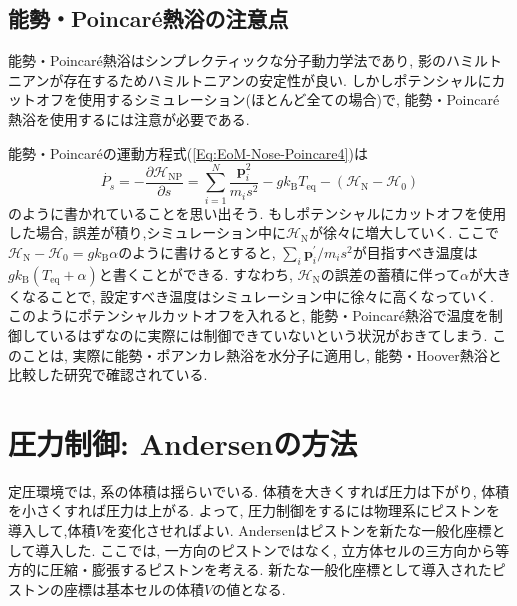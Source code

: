 \subsection{能勢・Poincar\'{e}熱浴の注意点}
能勢・Poincar\'{e}熱浴はシンプレクティックな分子動力学法であり, 影のハミルトニアンが存在するためハミルトニアンの安定性が良い. しかしポテンシャルにカットオフを使用するシミュレーション(ほとんど全ての場合)で, 能勢・Poincar\'{e}熱浴を使用するには注意が必要である. 

能勢・Poincar\'{e}の運動方程式(\ref{Eq:EoM-Nose-Poincare4})は
\begin{equation}
  \dot{P_{s}}
  =-
  \frac{\partial \mathcal{H}_{\mathrm{NP}}}{\partial s}
  =
  \sum_{i=1}^{N}
  \frac{\bm{p}_{i}^{2}}{m_{i}s^{2}}
  - g k_{\mathrm{B}} T_{\mathrm{eq}}
  - (\mathcal{H}_{\mathrm{N}} - \mathcal{H}_{0})
\end{equation}
のように書かれていることを思い出そう. もしポテンシャルにカットオフを使用した場合, 誤差が積り,シミュレーション中に$\mathcal{H}_{\mathrm{N}}$が徐々に増大していく.
ここで$\mathcal{H}_{\mathrm{N}} - \mathcal{H}_{0} = g k_{\mathrm{B}} \alpha$のように書けるとすると, $\sum_{i}\bm{p}_{i}^{\prime}/m_{i}s^{2}$が目指すべき温度は$g k_{\mathrm{B}} (T_{\mathrm{eq}} + \alpha)$と書くことができる. すなわち, $\mathcal{H}_{\mathrm{N}}$の誤差の蓄積に伴って$\alpha$が大きくなることで, 設定すべき温度はシミュレーション中に徐々に高くなっていく. このようにポテンシャルカットオフを入れると, 能勢・Poincar\'{e}熱浴で温度を制御しているはずなのに実際には制御できていないという状況がおきてしまう. このことは, 実際に能勢・ポアンカレ熱浴を水分子に適用し, 能勢・Hoover熱浴と比較した研究\cite{Okumura2007}で確認されている.


\clearpage
\section{圧力制御: Andersenの方法}
定圧環境では, 系の体積は揺らいでいる. 
体積を大きくすれば圧力は下がり, 体積を小さくすれば圧力は上がる. 
よって, 圧力制御をするには物理系にピストンを導入して,体積$V$を変化させればよい. 
Andersenはピストンを新たな一般化座標として導入した\cite{1980Andersen}. 
ここでは, 一方向のピストンではなく, 立方体セルの三方向から等方的に圧縮・膨張するピストンを考える. 
新たな一般化座標として導入されたピストンの座標は基本セルの体積$V$の値となる.

